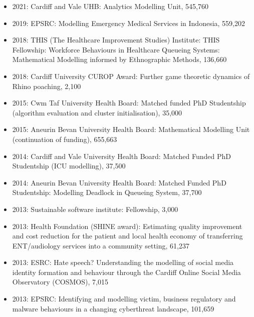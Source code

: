 \documentclass[10pt]{article}
\begin{document}
\begin{itemize}

  \item 2021: Cardiff and Vale UHB: Analytics Modelling Unit, 545,760

  \item 2019: EPSRC: Modelling Emergency Medical Services in Indonesia, 559,202

  \item 2018: THIS (The Healthcare Improvement Studies) Institute: THIS Fellowship: Workforce Behaviours in Healthcare Queueing Systems: Mathematical Modelling informed by Ethnographic Methods, 136,660

  \item 2018: Cardiff University CUROP Award: Further game theoretic dynamics of Rhino poaching, 2,100

  \item 2015: Cwm Taf University Health Board: Matched funded PhD Studentship (algorithm evaluation and cluster initialisation), 35,000

  \item 2015: Aneurin Bevan University Health Board: Mathematical Modelling Unit (continuation of funding), 655,663

  \item 2014: Cardiff and Vale University Health Board: Matched Funded PhD Studentship (ICU modelling), 37,500

  \item 2014: Aneurin Bevan University Health Board: Matched Funded PhD Studentship: Modelling Deadlock in Queueing System, 37,700

  \item 2013: Sustainable software institute: Fellowship, 3,000

  \item 2013: Health Foundation (SHINE award): Estimating quality improvement and cost reduction for the patient and local health economy of transferring ENT/audiology services into a community setting, 61,237

  \item 2013: ESRC: Hate speech? Understanding the modelling of social media identity formation and behaviour through the Cardiff Online Social Media Observatory (COSMOS), 7,015

  \item 2013: EPSRC: Identifying and modelling victim, business regulatory and malware behaviours in a changing cyberthreat landscape, 101,659


\end{itemize}
\end{document}
